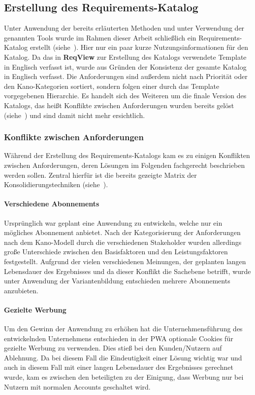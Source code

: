 \subsection{Erstellung des Requirements-Katalog}\label{subsec:requirements}
Unter Anwendung der bereits erläuterten Methoden und unter Verwendung der genannten Tools wurde im Rahmen dieser Arbeit
schließlich ein Requirements-Katalog erstellt (siehe~).
Hier nur ein paar kurze Nutzungsinformationen für den Katalog.
Da das in \textbf{ReqView} zur Erstellung des Katalogs verwendete Template in Englisch verfasst ist, wurde aus Gründen
der Konsistenz der gesamte Katalog in Englisch verfasst.
Die Anforderungen sind außerdem nicht nach Priorität oder den Kano-Kategorien sortiert, sondern folgen einer durch das
Template vorgegebenen Hierarchie.
Es handelt sich des Weiteren um die finale Version des Katalogs, das heißt Konflikte zwischen Anforderungen wurden bereits
gelöst (siehe~) und sind damit nicht mehr ersichtlich.

\subsubsection{Konflikte zwischen Anforderungen}\label{subsubsec:conflicts}
Während der Erstellung des Requirements-Katalogs kam es zu einigen Konflikten zwischen Anforderungen, deren Lösungen im Folgenden
fachgerecht beschrieben werden sollen.
Zentral hierfür ist die bereits gezeigte Matrix der Konsolidierungstechniken (siehe~).

\paragraph{Verschiedene Abonnements}
Ursprünglich war geplant eine Anwendung zu entwickeln, welche nur ein mögliches Abonnement anbietet.
Nach der Kategorisierung der Anforderungen nach dem Kano-Modell durch die verschiedenen Stakeholder wurden allerdings
große Unterschiede zwischen den Basisfaktoren und den Leistungsfaktoren festgestellt.
Aufgrund der vielen verschiedenen Meinungen, der geplanten langen Lebensdauer des Ergebnisses und da dieser Konflikt die
Sachebene betrifft, wurde unter Anwendung der Variantenbildung entschieden mehrere Abonnements anzubieten.

\paragraph{Gezielte Werbung}
Um den Gewinn der Anwendung zu erhöhen hat die Unternehmensführung des entwickelnden Unternehmens entschieden in der PWA
optionale Cookies für gezielte Werbung zu verwenden.
Dies stieß bei den Kunden/Nutzern auf Ablehnung.
Da bei diesem Fall die Eindeutigkeit einer Lösung wichtig war und auch in diesem Fall mit einer langen Lebensdauer des
Ergebnisses gerechnet wurde, kam es zwischen den beteiligten zu der Einigung, dass Werbung nur bei Nutzern mit normalen
Accounts geschaltet wird.
